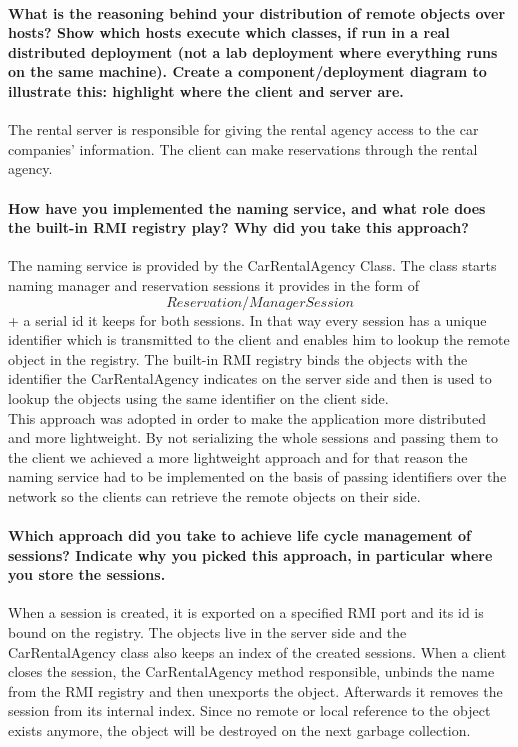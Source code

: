 \documentclass{ds-report}
\begin{document}
	
	\paragraph{What is the reasoning behind your distribution of remote objects over hosts? Show which
hosts execute which classes, if run in a real distributed deployment (not a lab deployment where everything runs on the same machine). Create a component/deployment diagram to illustrate this: highlight where the client and server are.\\}
	The rental server is responsible for giving the rental agency access to the car companies' information. The client can make reservations through the rental agency.

	
	\paragraph{How have you implemented the naming service, and what role does the built-in RMI registry play? Why did you take this approach?\\}
    The naming service is provided by the CarRentalAgency Class. The class starts naming manager and reservation sessions it provides in the form of
    \[Reservation/ManagerSession\] + a serial id it keeps for both sessions. In that way every session has a unique identifier which is transmitted to
    the client and enables him to lookup the remote object in the registry. The built-in RMI registry binds the objects with the identifier the CarRentalAgency
    indicates on the server side and then is used to lookup the objects using the same identifier on the client side.\\
    This approach was adopted in order to make the application more distributed and more lightweight. By not serializing the whole sessions and passing them
    to the client we achieved a more lightweight approach and for that reason the naming service had to be implemented on the basis of
    passing identifiers over the network so the clients can retrieve the remote objects on their side.
	
	\paragraph{Which approach did you take to achieve life cycle management of sessions? Indicate why you picked this approach, in particular where you store the sessions.\\}
    When a session is created, it is exported on a specified RMI port and its id is bound on the registry. The objects live in the server side
    and the CarRentalAgency class also keeps an index of the created sessions. When a client closes the session, the CarRentalAgency method responsible,
    unbinds the name from the RMI registry and then unexports the object. Afterwards it removes the session from its internal index.
    Since no remote or local reference to the object exists anymore, the object will be destroyed on the next garbage collection.
	
\end{document}
